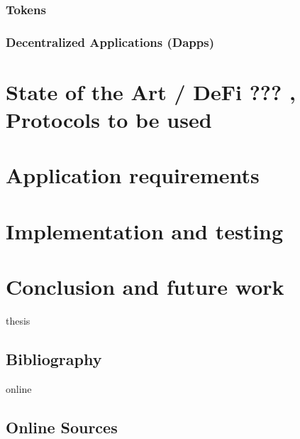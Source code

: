 \documentclass[11pt,a4paper]{report}
\begin{document}
\subsection{Tokens}
\subsection{Decentralized Applications (Dapps)}


\chapter{State of the Art / DeFi   ???  , Protocols to be used} \label{ch:soa}

\chapter{Application requirements} \label{ch:appreq}



\chapter{Implementation and testing} \label{ch:impl}
\newpage


\chapter{Conclusion and future work} \label{ch:conclusion}

\newpage


\begin{btSect}{thesis} %
\section*{Bibliography}
\btPrintCited
\end{btSect}
\begin{btSect}{online}
\section*{Online Sources}
\btPrintCited
\end{btSect}
\end{document}
